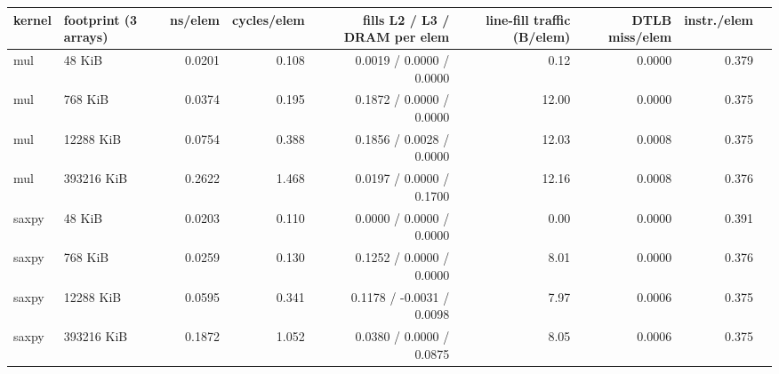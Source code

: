 \begin{tabular}{llrrrrrrr}
\toprule
kernel & footprint (3 arrays) & ns/elem & cycles/elem & fills L2 / L3 / DRAM per elem & line-fill traffic (B/elem) & DTLB miss/elem & instr./elem \\
\midrule
mul & 48 KiB & 0.0201 & 0.108 & 0.0019 / 0.0000 / 0.0000 & 0.12 & 0.0000 & 0.379 \\
mul & 768 KiB & 0.0374 & 0.195 & 0.1872 / 0.0000 / 0.0000 & 12.00 & 0.0000 & 0.375 \\
mul & 12288 KiB & 0.0754 & 0.388 & 0.1856 / 0.0028 / 0.0000 & 12.03 & 0.0008 & 0.375 \\
mul & 393216 KiB & 0.2622 & 1.468 & 0.0197 / 0.0000 / 0.1700 & 12.16 & 0.0008 & 0.376 \\
saxpy & 48 KiB & 0.0203 & 0.110 & 0.0000 / 0.0000 / 0.0000 & 0.00 & 0.0000 & 0.391 \\
saxpy & 768 KiB & 0.0259 & 0.130 & 0.1252 / 0.0000 / 0.0000 & 8.01 & 0.0000 & 0.376 \\
saxpy & 12288 KiB & 0.0595 & 0.341 & 0.1178 / -0.0031 / 0.0098 & 7.97 & 0.0006 & 0.375 \\
saxpy & 393216 KiB & 0.1872 & 1.052 & 0.0380 / 0.0000 / 0.0875 & 8.05 & 0.0006 & 0.375 \\
\bottomrule
\end{tabular}
